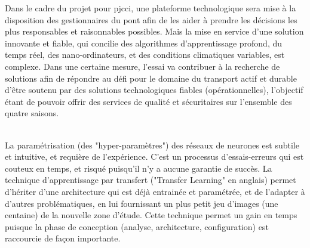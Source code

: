 ﻿\noindent Dans le cadre du projet pour \acrshort{pjcci}, une plateforme technologique sera mise à la disposition des gestionnaires du pont afin de les aider à prendre les décisions les plus responsables et raisonnables possibles. Mais la mise en service d'une solution innovante et fiable, qui concilie des algorithmes d'apprentissage profond, du temps réel, des nano-ordinateurs, et des conditions climatiques variables, est complexe. Dans une certaine mesure, l'essai va contribuer à la recherche de solutions afin de répondre au défi pour le domaine du transport actif et durable d'être soutenu par des solutions technologiques fiables (opérationnelles), l'objectif étant de pouvoir offrir des services de qualité et sécuritaires sur l'ensemble des quatre saisons.
\begin{comment}
\vspace{0.5\baselineskip}
\\
\noindent Il est difficile de trouver des jeux de données pour entrainer les réseaux de neurones pleinement connectés (\acrshort{fcn}) adaptés à la problématique. La technique de transfert d'apprentissage permet de démarrer d'une architecture qui a déjà appris avec un jeu d'images important (milliers d'images), et de lui faire apprendre davantage, en lui fournissant un plus petit jeu d'images (centaines d'images) de la nouvelle zone d'étude. Par exemple une architecture peut avoir appris à classifier des images de la Californie, aux États-Unis. Pour lui permettre de classifier des images de la Ville de Sherbrooke, il est souhaitable de lui fournir un nouveau jeu de données spécifique à cette ville afin qu'il s'adapte (ses paramètres) à cette région. Dans le contexte de cet essai, cela se traduit par réentrainer différents modèles avec des images de la piste multifonctionnelle du pont Jacques-Cartier.
\end{comment}
\vspace{0.5\baselineskip}
\\
\noindent La paramétrisation (des "hyper-paramètres") des réseaux de neurones est subtile et intuitive, et requière de l'expérience. C'est un processus d'essais-erreurs qui est couteux en temps, et risqué puisqu'il n'y a aucune garantie de succès. La technique d'apprentissage par transfert ("Transfer Learning" en anglais) permet d'hériter d'une architecture qui est déjà entrainée et paramétrée, et de l'adapter à d'autres problématiques, en lui fournissant un plus petit jeu d'images (une centaine) de la nouvelle zone d'étude. Cette technique permet un gain en temps puisque la phase de conception (analyse, architecture, configuration) est raccourcie de façon importante.
